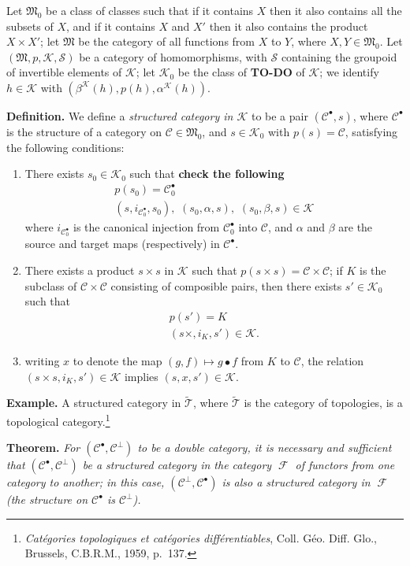 \documentclass{article}
\newenvironment{itenv}[1]
  {\phantomsection\par\medskip\noindent\textbf{#1.}\itshape}
  {\par\medskip}
\newenvironment{rmenv}[1]
  {\phantomsection\par\medskip\noindent\textbf{#1.}\rmfamily}
  {\par\medskip}
\newcommand{\oldpage}[1]{\marginpar{\footnotesize$\Big\vert$ \textit{p.~#1}}}
\newcommand{\todo}{{\color{purple}\textbf{TO-DO }}}
\newcommand{\unsure}[1]{{\color{purple}\textbf{#1}}}
\newcommand{\CC}{\mathcal{C}}
\DeclareMathOperator{\FF}{\mathcal{F}}
\newcommand{\MM}{\mathfrak{M}}
\newcommand{\KK}{\mathcal{K}}
\renewcommand{\SS}{\mathcal{S}}
\newcommand{\TT}{\mathcal{T}}
\begin{document}
Let $\MM_0$ be a class of classes such that if it contains $X$ then it also contains all the subsets of $X$, and if it contains $X$ and $X'$ then it also contains the product $X\times X'$;
let $\MM$ be the category of all functions from $X$ to $Y$, where $X,Y\in\MM_0$.
Let $(\MM,p,\KK,\SS)$ be a category of homomorphisms, with $\SS$ containing the groupoid of invertible elements of $\KK$;
let $\KK_0$ be the class of \todo of $\KK$;
we identify $h\in\KK$ with $(\beta^\KK(h),p(h),\alpha^\KK(h))$.

\begin{rmenv}{Definition}
  We define a \emph{structured category in $\KK$} to be a pair $(\CC^\bullet,s)$, where $\CC^\bullet$ is the structure of a category on $\CC\in\MM_0$, and $s\in\KK_0$ with $p(s)=\CC$, satisfying the following conditions:
  \begin{enumerate}
    \item There exists $s_0\in\KK_0$ such that \unsure{check the following}
      \[
        \begin{gathered}
          p(s_0)
          = \CC_0^\bullet
        \\(s,i_{\CC_0^\bullet},s_0),\,\,
          (s_0,\alpha,s),\,\,
          (s_0,\beta,s)
          \in\KK
        \end{gathered}
      \]
      where $i_{\CC_0^\bullet}$ is the canonical injection from $\CC_0^\bullet$ into $\CC$, and $\alpha$ and $\beta$ are the source and target maps (respectively) in $\CC^\bullet$.
    \item There exists a product $s\times s$ in $\KK$ such that $p(s\times s)=\CC\times\CC$;
      if $K$ is the subclass of $\CC\times\CC$ consisting of composible pairs, then there exists $s'\in\KK_0$ such that
      \[
        \begin{gathered}
          p(s')=K
        \\(s\times ,i_K,s')\in\KK.
        \end{gathered}
      \]
    \item writing $x$ to denote the map $(g,f)\mapsto g\bullet f$ from $K$ to $\CC$, the relation $(s\times s,i_K,s')\in\KK$ implies $(s,x,s')\in\KK$.
  \end{enumerate}
\end{rmenv}

\begin{rmenv}{Example}
  A structured category in $\tilde{\TT}$, where $\tilde{\TT}$ is the category of topologies, is a topological category.\footnote{\emph{Catégories topologiques et catégories différentiables}, Coll. Géo. Diff. Glo., Brussels, C.B.R.M., 1959, p.~137.}
\end{rmenv}

\oldpage{4}

\begin{itenv}{Theorem}
  For $(\CC^\bullet,\CC^\perp)$ to be a double category, it is necessary and sufficient that $(\CC^\bullet,\CC^\perp)$ be a structured category in the category $\FF$ of functors from one category to another;
  in this case, $(\CC^\perp,\CC^\bullet)$ is also a structured category in $\FF$ (the structure on $\CC^\bullet$ is $\CC^\perp$).
\end{itenv}
\end{document}
